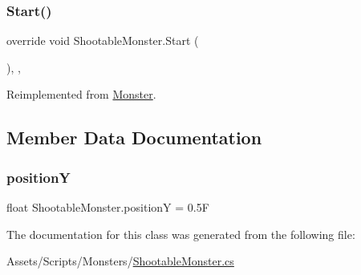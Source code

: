 \subsubsection{\texorpdfstring{Start()}{Start()}}
{\footnotesize\ttfamily override void Shootable\+Monster.\+Start (\begin{DoxyParamCaption}{ }\end{DoxyParamCaption})\hspace{0.3cm}{\ttfamily [inline]}, {\ttfamily [protected]}, {\ttfamily [virtual]}}



Reimplemented from \mbox{\hyperlink{class_monster_a79f369a560bdcf5b3dfaf8c9382582d8}{Monster}}.



\subsection{Member Data Documentation}
\mbox{\label{class_shootable_monster_a3dc33446a2d7405d4c0f49de76c4961d}} 
\subsubsection{\texorpdfstring{positionY}{positionY}}
{\footnotesize\ttfamily float Shootable\+Monster.\+positionY = 0.\+5F}



The documentation for this class was generated from the following file\+:\begin{DoxyCompactItemize}
\item 
Assets/\+Scripts/\+Monsters/\mbox{\hyperlink{_shootable_monster_8cs}{Shootable\+Monster.\+cs}}\end{DoxyCompactItemize}
